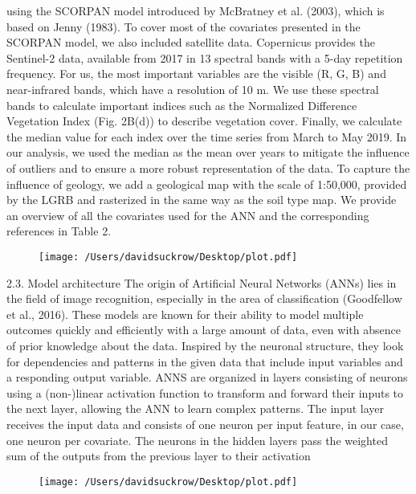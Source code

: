 using the SCORPAN model introduced by McBratney et al. (2003),
which is based on Jenny (1983). To cover most of the covariates presented
in the SCORPAN model, we also included satellite data. Copernicus
provides the Sentinel-2 data, available from 2017 in 13 spectral
bands with a 5-day repetition frequency. For us, the most important
variables are the visible (R, G, B) and near-infrared bands, which have a
resolution of 10 m. We use these spectral bands to calculate important
indices such as the Normalized Difference Vegetation Index (Fig. 2B(d))
to describe vegetation cover. Finally, we calculate the median value for
each index over the time series from March to May 2019. In our analysis,
we used the median as the mean over years to mitigate the influence of
outliers and to ensure a more robust representation of the data. To
capture the influence of geology, we add a geological map with the scale
of 1:50,000, provided by the LGRB and rasterized in the same way as the
soil type map. We provide an overview of all the covariates used for the
ANN and the corresponding references in Table 2.


\begin{figure}[h!]  %
    \centering      %
    \texttt{[image: /Users/davidsuckrow/Desktop/plot.pdf]}  %
    \label{fig:example}  %
\end{figure}


2.3. Model architecture
The origin of Artificial Neural Networks (ANNs) lies in the field of
image recognition, especially in the area of classification (Goodfellow
et al., 2016). These models are known for their ability to model multiple
outcomes quickly and efficiently with a large amount of data, even with
absence of prior knowledge about the data. Inspired by the neuronal
structure, they look for dependencies and patterns in the given data that
include input variables and a responding output variable. ANNS are
organized in layers consisting of neurons using a (non-)linear activation
function to transform and forward their inputs to the next layer,
allowing the ANN to learn complex patterns. The input layer receives the
input data and consists of one neuron per input feature, in our case, one
neuron per covariate. The neurons in the hidden layers pass the
weighted sum of the outputs from the previous layer to their activation

\begin{figure}[h!]  %
    \centering      %
    \texttt{[image: /Users/davidsuckrow/Desktop/plot.pdf]}  %
    \label{fig:example}  %
\end{figure}

